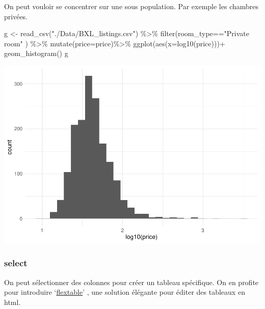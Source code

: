 \documentclass[
]{book}
\newenvironment{Shaded}{\begin{snugshade}}{\end{snugshade}}
\newcommand{\AttributeTok}[1]{\textcolor[rgb]{0.77,0.63,0.00}{#1}}
\newcommand{\FunctionTok}[1]{\textcolor[rgb]{0.00,0.00,0.00}{#1}}
\newcommand{\NormalTok}[1]{#1}
\newcommand{\OtherTok}[1]{\textcolor[rgb]{0.56,0.35,0.01}{#1}}
\newcommand{\SpecialCharTok}[1]{\textcolor[rgb]{0.00,0.00,0.00}{#1}}
\newcommand{\StringTok}[1]{\textcolor[rgb]{0.31,0.60,0.02}{#1}}
\begin{document}
On peut vouloir se concentrer sur une sous population. Par exemple les chambres privées.

\begin{Shaded}
\begin{Highlighting}[]
\NormalTok{g }\OtherTok{\textless{}{-}} \FunctionTok{read\_csv}\NormalTok{(}\StringTok{"./Data/BXL\_listings.csv"}\NormalTok{) }\SpecialCharTok{\%\textgreater{}\%} 
  \FunctionTok{filter}\NormalTok{(room\_type}\SpecialCharTok{==}\StringTok{"Private room"}\NormalTok{ ) }\SpecialCharTok{\%\textgreater{}\%} 
    \FunctionTok{mutate}\NormalTok{(}\AttributeTok{price=}\NormalTok{price)}\SpecialCharTok{\%\textgreater{}\%}
  \FunctionTok{ggplot}\NormalTok{(}\FunctionTok{aes}\NormalTok{(}\AttributeTok{x=}\FunctionTok{log10}\NormalTok{(price)))}\SpecialCharTok{+}
  \FunctionTok{geom\_histogram}\NormalTok{()}
\NormalTok{g}
\end{Highlighting}
\end{Shaded}

\includegraphics{bookdown-demo_files/figure-latex/0205-1.pdf}

\hypertarget{select}{%
\subsubsection{select}\label{select}}

On peut sélectionner des colonnes pour créer un tableau spécifique. On en profite pour introduire `\href{https://ardata-fr.github.io/flextable-book/index.html}{flextable}' , une solution élégante pour éditer des tableaux en html.
\end{document}
